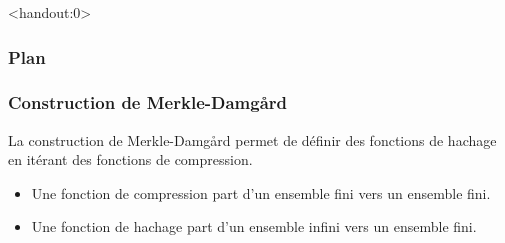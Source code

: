 \begin{frame}<handout:0>
  \frametitle{Plan}
  \tableofcontents[currentsection,subsectionstyle=hide]
\end{frame}

\begin{frame}[fragile]
  \frametitle{Construction de Merkle-Damg\r{a}rd}
  
  La construction de Merkle-Damg\r{a}rd permet de définir des fonctions de hachage en itérant des fonctions de compression.
  \begin{itemize}
  \item{Une fonction de compression part d'un ensemble fini vers un ensemble fini.}
  \item{Une fonction de hachage part d'un ensemble infini vers un ensemble fini.}
  \end{itemize}
\end{frame}

